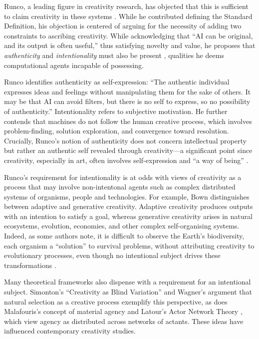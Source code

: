 Runco, a leading figure in creativity research, has objected that this is sufficient to claim creativity in these systems \cite{Runco2023-qi}. While he contributed defining the Standard Definition, his objection is centered of arguing for the necessity of adding two constraints to ascribing creativity. While acknowledging that “AI can be original, and its output is often useful,” thus satisfying novelty and value, he proposes that \emph{authenticity} and \emph{intentionality} must also be present \cite{Runco2025-bu}, qualities he deems computational agents incapable of possessing.

Runco identifies authenticity as self-expression: “The authentic individual expresses ideas and feelings without manipulating them for the sake of others. It may be that AI can avoid filters, but there is no self to express, so no possibility of authenticity.” Intentionality refers to subjective motivation. He further contends that machines do not follow the human creative process, which involves problem-finding, solution exploration, and convergence toward resolution. Crucially, Runco’s notion of authenticity does not concern intellectual property but rather an authentic self revealed through creativity—a significant point since creativity, especially in art, often involves self-expression and “a way of being” \cite{Rubin2023-lw}.

Runco's requirement for intentionality is at odds with views of creativity as a process that may involve non-intentonal agents such as complex distributed systems of organisms, people and technologies. For example, Bown \cite{Bown2012-gg} distinguishes between adaptive and generative creativity. Adaptive creativity produces outputs with an intention to satisfy a goal, whereas generative creativity arises in natural ecosystems, evolution, economies, and other complex self-organising systems. Indeed, as some authors note, it is difficult to observe the Earth’s biodiversity, each organism a “solution” to survival problems, without attributing creativity to evolutionary processes, even though no intentional subject drives these transformations \cite{Wagner2015-oj}.

Many theoretical frameworks also dispense with a requirement for an intentional subject. Simonton’s “Creativity as Blind Variation” \cite{Simonton1999-yc} and Wagner’s argument that natural selection as a creative process \cite{Wagner2015-oj} exemplify this perspective, as does Malafouris’s concept of material agency \cite{Malafouris2013-by, Malafouris2008-xn} and Latour’s Actor Network Theory \cite{Latour2007-ep}, which view agency as distributed across networks of actants. These ideas have influenced contemporary creativity studies.

